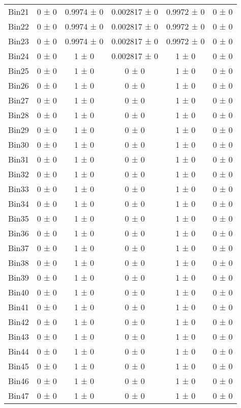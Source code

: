 \begin{tabular}{@{\extracolsep{4pt}}lccccc@{}}
     Bin21 & 0 ± 0 & 0.9974 ± 0 & 0.002817 ± 0 & 0.9972 ± 0 & 0 ± 0 \\ 
     Bin22 & 0 ± 0 & 0.9974 ± 0 & 0.002817 ± 0 & 0.9972 ± 0 & 0 ± 0 \\ 
     Bin23 & 0 ± 0 & 0.9974 ± 0 & 0.002817 ± 0 & 0.9972 ± 0 & 0 ± 0 \\ 
     Bin24 & 0 ± 0 & 1 ± 0 & 0.002817 ± 0 & 1 ± 0 & 0 ± 0 \\ 
     Bin25 & 0 ± 0 & 1 ± 0 & 0 ± 0 & 1 ± 0 & 0 ± 0 \\ 
     Bin26 & 0 ± 0 & 1 ± 0 & 0 ± 0 & 1 ± 0 & 0 ± 0 \\ 
     Bin27 & 0 ± 0 & 1 ± 0 & 0 ± 0 & 1 ± 0 & 0 ± 0 \\ 
     Bin28 & 0 ± 0 & 1 ± 0 & 0 ± 0 & 1 ± 0 & 0 ± 0 \\ 
     Bin29 & 0 ± 0 & 1 ± 0 & 0 ± 0 & 1 ± 0 & 0 ± 0 \\ 
     Bin30 & 0 ± 0 & 1 ± 0 & 0 ± 0 & 1 ± 0 & 0 ± 0 \\ 
     Bin31 & 0 ± 0 & 1 ± 0 & 0 ± 0 & 1 ± 0 & 0 ± 0 \\ 
     Bin32 & 0 ± 0 & 1 ± 0 & 0 ± 0 & 1 ± 0 & 0 ± 0 \\ 
     Bin33 & 0 ± 0 & 1 ± 0 & 0 ± 0 & 1 ± 0 & 0 ± 0 \\ 
     Bin34 & 0 ± 0 & 1 ± 0 & 0 ± 0 & 1 ± 0 & 0 ± 0 \\ 
     Bin35 & 0 ± 0 & 1 ± 0 & 0 ± 0 & 1 ± 0 & 0 ± 0 \\ 
     Bin36 & 0 ± 0 & 1 ± 0 & 0 ± 0 & 1 ± 0 & 0 ± 0 \\ 
     Bin37 & 0 ± 0 & 1 ± 0 & 0 ± 0 & 1 ± 0 & 0 ± 0 \\ 
     Bin38 & 0 ± 0 & 1 ± 0 & 0 ± 0 & 1 ± 0 & 0 ± 0 \\ 
     Bin39 & 0 ± 0 & 1 ± 0 & 0 ± 0 & 1 ± 0 & 0 ± 0 \\ 
     Bin40 & 0 ± 0 & 1 ± 0 & 0 ± 0 & 1 ± 0 & 0 ± 0 \\ 
     Bin41 & 0 ± 0 & 1 ± 0 & 0 ± 0 & 1 ± 0 & 0 ± 0 \\ 
     Bin42 & 0 ± 0 & 1 ± 0 & 0 ± 0 & 1 ± 0 & 0 ± 0 \\ 
     Bin43 & 0 ± 0 & 1 ± 0 & 0 ± 0 & 1 ± 0 & 0 ± 0 \\ 
     Bin44 & 0 ± 0 & 1 ± 0 & 0 ± 0 & 1 ± 0 & 0 ± 0 \\ 
     Bin45 & 0 ± 0 & 1 ± 0 & 0 ± 0 & 1 ± 0 & 0 ± 0 \\ 
     Bin46 & 0 ± 0 & 1 ± 0 & 0 ± 0 & 1 ± 0 & 0 ± 0 \\ 
     Bin47 & 0 ± 0 & 1 ± 0 & 0 ± 0 & 1 ± 0 & 0 ± 0 \\ 

\end{tabular}
